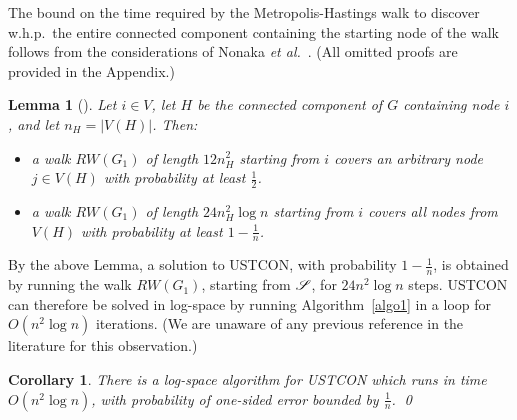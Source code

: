 \documentclass[11pt,a4paper]{article}
\newtheorem{corollary}{Corollary}
\newtheorem{lemma}{Lemma}
\newcommand{\etal}{\textsl{et al.}\xspace}
\newcommand{\s}{\ensuremath  \mathscr S}
\renewcommand{\*}{\hspace*{5mm}}
\begin{document}
The bound on the time required by the Metropolis-Hastings walk to discover w.h.p.\ the entire connected component containing the starting node of the walk follows from the considerations of Nonaka \etal~\cite{NOSY}. (All omitted proofs are provided in the Appendix.)

\begin{lemma}[\cite{NOSY}]\label{lemtwo}
Let $i \in V$, let $H$ be the connected component of $G$ containing node $i$, and let $n_H = |V(H)|$. Then:
\begin{itemize}
\item a walk $RW(G_1)$ of length $12 n_H^2$ starting from $i$ covers an arbitrary node $j\in V(H)$ with probability at least $\frac{1}{2}$.
\item a walk $RW(G_1)$ of length $24 n_H^2 \log n$ starting from $i$ covers all nodes from $V(H)$ with probability at least $1 - \frac{1}{n}$.
\end{itemize}
\end{lemma}

By the above Lemma, a solution to USTCON, with probability $1-\frac{1}{n}$, is obtained by running the walk $RW(G_1)$, starting from $\s$, for $24 n^2 \log n$ steps. USTCON can therefore be solved in log-space by running Algorithm~\ref{algo1} in a loop for $O(n^2 \log n)$ iterations. (We are unaware of any previous reference in the literature for this observation.)

\begin{corollary}
There is a log-space algorithm for USTCON which runs in time $O(n^2\log n)$, with probability of one-sided error bounded by $\frac{1}{n}$.
\qed
\end{corollary}
\end{document}
